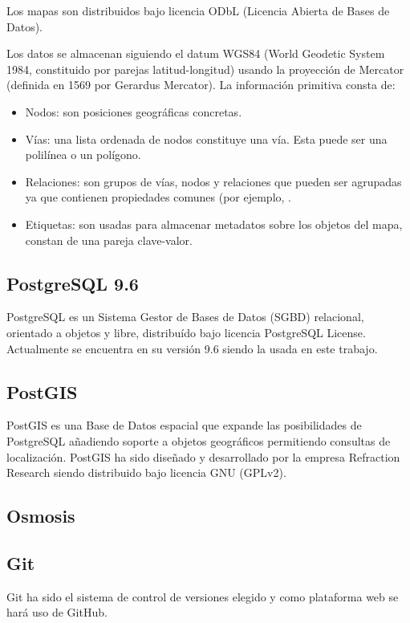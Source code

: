Los mapas son distribuidos bajo licencia ODbL (Licencia Abierta de Bases de Datos).

Los datos se almacenan siguiendo el datum WGS84 (World Geodetic System 1984, constituido por parejas latitud-longitud) usando la proyección de Mercator (definida en 1569  por Gerardus Mercator). La información primitiva consta de:

\begin{itemize}
	\item Nodos: son posiciones geográficas concretas.
	\item Vías: una lista ordenada de nodos constituye una vía. Esta puede ser una polilínea o un polígono.
	\item Relaciones: son grupos de vías, nodos y relaciones que pueden ser agrupadas ya que contienen propiedades comunes (por ejemplo, .
	\item Etiquetas: son usadas para almacenar metadatos sobre los objetos del mapa, constan de una pareja clave-valor. 
\end{itemize}

\subsection{PostgreSQL 9.6}
PostgreSQL es un Sistema Gestor de Bases de Datos (SGBD) relacional, orientado a objetos y libre, distribuído bajo licencia PostgreSQL License. Actualmente se encuentra en su versión 9.6 siendo la usada en este trabajo.

\subsection{PostGIS}
PostGIS es una Base de Datos espacial que expande las posibilidades de PostgreSQL añadiendo soporte a objetos geográficos permitiendo consultas de localización. PostGIS ha sido diseñado y desarrollado por la empresa Refraction Research siendo distribuido bajo licencia GNU (GPLv2).

\subsection{Osmosis}

\subsection{Git}
Git ha sido el sistema de control de versiones elegido y como plataforma web se hará uso de GitHub.

